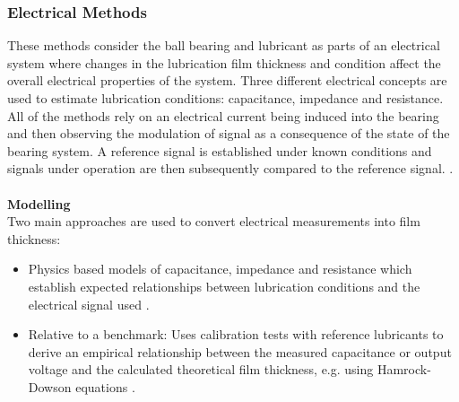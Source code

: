 \subsubsection{Electrical Methods}
These methods consider the ball bearing and lubricant as parts of an electrical system where changes in the lubrication film thickness and condition affect the overall electrical properties of the system. Three different electrical concepts are used to estimate lubrication conditions: capacitance, impedance and resistance. All of the methods rely on an electrical current being induced into the bearing and then observing the modulation of signal as a consequence of the state of the bearing system. A reference signal is established under known conditions and signals under operation are then subsequently compared to the reference signal. \cite{cen_ehl_2021} \cite{becker-dombrowsky_electrical_2024}.
\\\\
\textbf{Modelling}\\
Two main approaches are used to convert electrical measurements into film thickness:
\begin{itemize}
    \item Physics based models of capacitance, impedance and resistance which establish expected relationships between lubrication conditions and the electrical signal used \cite{cen_ehl_2021} \cite{becker-dombrowsky_electrical_2024} \cite{schneider_method_2022}.
    \item Relative to a benchmark: Uses calibration tests with reference lubricants to derive an empirical relationship between the measured capacitance or output voltage and the calculated theoretical film thickness, e.g. using Hamrock-Dowson equations \cite{cen_ehl_2021}.
\end{itemize}

